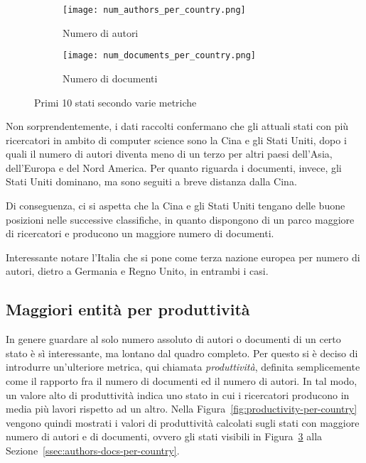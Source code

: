 \begin{figure}[tb]
  \centering
  \begin{subfigure}[b]{0.45\textwidth}
    \centering
    \texttt{[image: num\_authors\_per\_country.png]}
    \caption{Numero di autori}
    \label{fig:num-authors-per-country}
  \end{subfigure}
  \begin{subfigure}[b]{0.45\textwidth}
    \centering
    \texttt{[image: num\_documents\_per\_country.png]}
    \caption{Numero di documenti}
    \label{fig:num-documents-per-country}
  \end{subfigure}
  \caption{Primi 10 stati secondo varie metriche}
  \label{fig:top-10-country}
\end{figure}

Non sorprendentemente, i dati raccolti confermano che gli attuali stati
con più ricercatori in ambito di computer science sono la Cina e gli Stati Uniti,
dopo i quali il numero di autori diventa meno di un terzo per altri paesi
dell'Asia, dell'Europa e del Nord America.
Per quanto riguarda i documenti, invece, gli Stati Uniti dominano, ma sono
seguiti a breve distanza dalla Cina.

Di conseguenza, ci si aspetta che la Cina e gli Stati Uniti tengano delle buone
posizioni nelle successive classifiche, in quanto dispongono di un parco maggiore
di ricercatori e producono un maggiore numero di documenti.

Interessante notare l'Italia che si pone come terza nazione europea per numero
di autori, dietro a Germania e Regno Unito, in entrambi i casi.

\subsection{Maggiori entità per produttività}

In genere guardare al solo numero assoluto di autori o documenti di un certo
stato è sì interessante, ma lontano dal quadro completo. Per questo si è
deciso di introdurre un'ulteriore metrica, qui chiamata \textit{produttività},
definita semplicemente come il rapporto fra il numero di documenti ed il
numero di autori. In tal modo, un valore alto di produttività indica uno
stato in cui i ricercatori producono in media più lavori rispetto ad un
altro. Nella Figura~\ref{fig:productivity-per-country} vengono quindi mostrati i valori
di produttività calcolati sugli stati con maggiore numero di autori e di
documenti, ovvero gli stati visibili in Figura~\ref{fig:top-10-country} alla
Sezione~\ref{ssec:authors-docs-per-country}.

